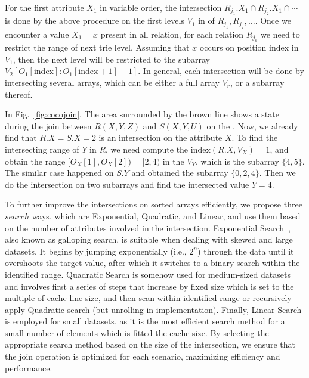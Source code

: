 For the first attribute $X_1$ in variable order, the intersection
$R_{j_1}.X_1 \cap R_{j_2}.X_1 \cap \cdots$ is done by the above
procedure on the first levels $V_1$ in \indexlayout of
$R_{j_1}, R_{j_2}, \ldots$.  Once we encounter a value $X_1 = x$
present in all relation, for each relation $R_{j_k}$ we need to
restrict the range of next trie level.  Assuming that $x$ occurs on
position $\mathrm{index}$ in $V_1$, then the next level will be
restricted to the subarray
$V_2[O_1[\mathrm{index}]: O_1[\mathrm{index}+1]-1]$.  In general, each
intersection will be done by intersecting several arrays, which can be
either a full \indexlayout array $V_r$, or a subarray thereof.

\begin{example}
  In Fig.~\ref{fig:cocojoin}, The area surrounded by the brown line shows a state during the join between $R(X, Y, Z)$ and $S(X, Y, U)$ on the \indexlayout. Now, we already find that $R.X = S.X = 2$ is an intersection on the attribute $X$. To find the intersecting range of $Y$ in $R$, we need compute the $\mathrm{index}(R.X, V_X) = 1$, and obtain the range $[O_X[1], O_X[2]) = [2, 4)$ in the $V_Y$, which is the subarray $\{4, 5\}$. The similar case happened on $S.Y$ and obtained the subarray $\{0, 2, 4\}$. Then we do the intersection on two subarrays and find the intersected value $Y = 4$.
\end{example}

To further improve the intersections on sorted arrays efficiently, 
we propose three $search$ ways, which are Exponential, Quadratic, and Linear, 
and use them based on the number of attributes involved in the intersection. 
Exponential Search~\cite{DBLP:conf/birthday/Baeza-YatesS10}, also known as galloping search, 
is suitable when dealing with skewed and large datasets. 
It begins by jumping exponentially (i.e., $2^n$) through the data until it overshoots the target value, 
after which it switches to a binary search within the identified range. 
Quadratic Search is somehow used for medium-sized datasets 
and involves first a series of steps that increase by fixed size 
which is set to the multiple of cache line size, 
and then scan within identified range or recursively apply Quadratic search (but unrolling in implementation). 
Finally, Linear Search is employed for small datasets, 
as it is the most efficient search method for a small number of elements which is fitted the cache size.
By selecting the appropriate search method based on the size of the intersection, 
we ensure that the join operation is optimized for each scenario, maximizing efficiency and performance.

